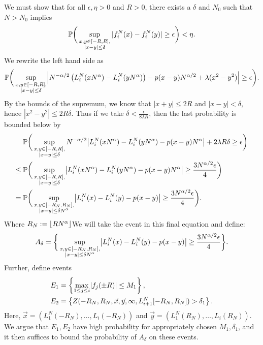 	We must show that for all $\epsilon,\eta>0$ and $R>0$, there exists a $\delta$ and $N_0$ such that $N>N_0$ implies 
	\[
	\mathbb{P}\bigg(\sup_{\substack{x,y\in [-R,R],\\ |x-y|\leq\delta}} |f^N_i(x) - f^N_i(y)| \geq \epsilon\bigg)<\eta.
	\]
	We rewrite the left hand side as
	\begin{align}
	\pr\bigg(\sup_{\substack{x,y\in [-R,R],\\ |x-y|\leq\delta}} \abs*{N^{-\alpha/2}\left(L^N_i(xN^{\alpha}) - L^N_i(yN^\alpha)\right)-p(x-y)N^{\alpha/2}+\lambda(x^2-y^2)} \geq \epsilon\bigg).
	\end{align}
	By the bounds of the supremum, we know that $|x+y|\leq 2R$ and $|x-y|<\delta$, hence $|x^2-y^2|\leq 2R\delta$. Thus if we take $\delta < \frac{\epsilon}{8\lambda R}$, then the last probability is bounded below by
	\begin{align*}
	&\pr\bigg(\sup_{\substack{x,y\in [-R,R],\\ |x-y|\leq\delta}} N^{-\alpha/2}\abs*{L_i^N(xN^\alpha)-L_i^N(yN^\alpha)-p(x-y)N^\alpha}+2\lambda R\delta\geq \epsilon\bigg)\\
	\leq \; & \pr\bigg(\sup_{\substack{x,y\in [-R,R],\\ |x-y|\leq\delta}} \abs*{L_i^N(xN^\alpha)-L_i^N(yN^\alpha)-p(x-y)N^\alpha}\geq \frac{3N^{\alpha/2}\epsilon}4\bigg)\\
	= \; & \pr\bigg(\sup_{\substack{x,y\in [-R_N,R_N],\\ |x-y|\leq \delta N^\alpha}} \abs*{L_i^N(x)-L_i^N(y)-p(x-y)}\geq \frac{3N^{\alpha/2}\epsilon}4\bigg).
	\end{align*}
	Where $R_N:=\lfloor RN^\alpha\rfloor$We will take the event in this final equation and define:
	\begin{equation}\label{Adelta}
	A_\delta =\bigg\{\sup_{\substack{x,y\in [-R_N,R_N],\\ |x-y|\leq \delta N^\alpha}} \abs*{L_i^N(x)-L_i^N(y)-p(x-y)}\geq \frac{3N^{\alpha/2}\epsilon}4\bigg\}.
	\end{equation}
	Further, define events
	\begin{align*}
	E_1&=\left\{\max_{1\leq j \leq i}\abs*{f_j(\pm R)}\leq M_1\right\},\\
	E_2&=\left\{Z(-R_N, R_N, \vec x, \vec y, \infty, L_{i+1}^N[-R_N, R_N])>\delta_1\right\}.\label{BiasDef}
	\end{align*}
	Here, $\vec{x} = (L_1^N(-R_N),\dots,L_i(-R_N))$ and $\vec{y} = (L_1^N(R_N),\dots,L_i(R_N))$. We argue that $E_1,E_2$ have high probability for appropriately chosen $M_1,\delta_1$, and it then suffices to bound the probability of $A_\delta$ on these events.
	

